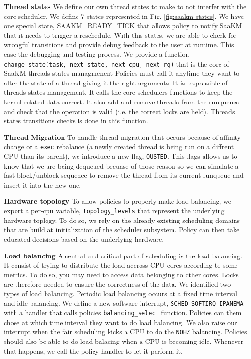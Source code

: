 \textbf{Thread states} We define our own thread states to make to not interfer with the core scheduler. We define 7 states represented in Fig. \ref{fig:saakm-states}. We have one special state, SAAKM\_READY\_TICK that allows policy to notify SaaKM that it needs to trigger a reschedule. With this states, we are able to check for wrongful transitions and provide debug feedback to the user at runtime. This ease the debugging and testing process. We provide a function \texttt{change\_state(task, next\_state, next\_cpu, next\_rq)} that is the core of SaaKM threads states managmenent Policies must call it anytime they want to alter the state of a thread giving it the right arguments. It is responsible of threads states management. It calls the core schedulers functions to keep the kernel related data correct. It also add and remove threads from the runqueues and check that the operation is valid (i.e. the correct locks are held). Threads states transitions checks is done in this function.

\textbf{Thread Migration} To handle thread migration that occurs because of affinity change or a \texttt{exec} rebalance (a newly created thread is being run on a diffrent CPU than its parent), we introduce a new flag, \texttt{OUSTED}. This flags allows us to know that we are being dequeued becuase of those reason so we can simulate a fast block/unblock sequence to remove the thread from its current runqueue and insert it into the new one. 

\textbf{Hardware topology} To allow policies to properly make load balancing, we export a per-cpu variable, \texttt{topology\_levels} that represent the underlying hardware toplogy. To do so, we rely on the already existing scheduling domains that are build at initialization of the scheduler subsystem. Policy can then take educated decisions based on the underlying hardware.

\textbf{Load balancing} A central and critical part of scheduling is the load balancing. It consist of trying to distribute the load accross CPU cores according to some metrics. To do so, you may need to access data belonging to other cores. Locks are therefore needed to ensure the correctness of the data. We identified two types of load balancing. Periodic load balancing occurs at a fixed time interval and idle balancing. We define a new software interrupt, \texttt{SCHED\_SOFTIRQ\_IPANEMA} with a handler that calls policies \texttt{balancing\_select} function. Policies can them chose at which time interval they want to do load balancing. We also raise our interrupt when the fair scheduling kicks a CPU to do the \texttt{NOHZ} balancing. Policies should also be able to do load balacing when a CPU is becoming idle. Whenever that happens, we call the policy handler to let it perform it. 


